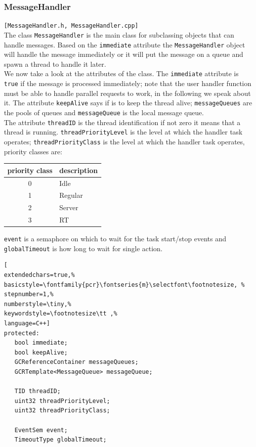 \subsubsection{MessageHandler}
\texttt{[MessageHandler.h, MessageHandler.cpp]}\\
The class \texttt{MessageHandler} is the main class for subclassing objects that can handle messages.
Based on the \texttt{immediate} attribute the \texttt{MessageHandler} object will handle the message immediately or it will put the message on a queue and spawn a thread to handle it later. \\


We now take a look at the attributes of the class. The \texttt{immediate} attribute is \texttt{true} if the message is processed immediately; note that the user handler function must be able to handle parallel requests to work, in the following we speak about it. The attribute \texttt{keepAlive} says if is to keep the thread alive; \texttt{messageQueues} are the pools of queues and \texttt{messageQueue} is the local message queue. \\


The attribute \texttt{threadID} is the thread identification if not zero it means that a thread is running. \texttt{threadPriorityLevel} is the level at which the handler task operates; \texttt{threadPriorityClass} is the level at which the handler task operates, priority classes are:

\begin{table}[!h]
 \begin{center}
  \begin{tabular}{cl}
priority class & description \\
   \hline
0 & Idle \\
1 & Regular \\
2 & Server \\
3 & RT \\
  \end{tabular}
 \end{center}
\end{table}

\texttt{event} is a semaphore on which to wait for the task start/stop events and \texttt{globalTimeout} is how long to wait for single action.
\begin{lstlisting}[
extendedchars=true,%
basicstyle=\fontfamily{pcr}\fontseries{m}\selectfont\footnotesize, %
stepnumber=1,%
numberstyle=\tiny,%
keywordstyle=\footnotesize\tt ,%
language=C++]
protected:
   bool immediate;
   bool keepAlive;
   GCReferenceContainer messageQueues;
   GCRTemplate<MessageQueue> messageQueue;

   TID threadID;
   uint32 threadPriorityLevel;
   uint32 threadPriorityClass;

   EventSem event;
   TimeoutType globalTimeout;
\end{lstlisting}

